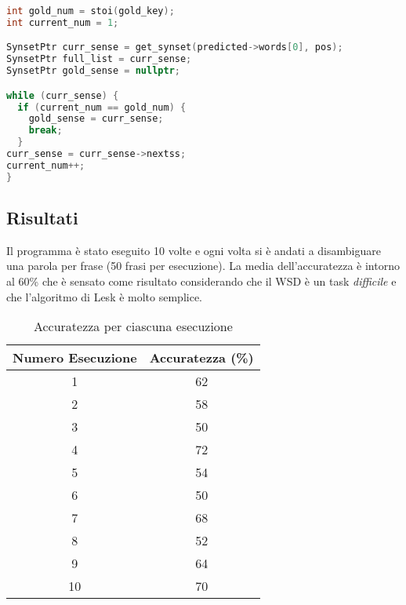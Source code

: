 \begin{lstlisting}[language=cpp, caption= Validazione della predizione dell'algoritmo di Lesk tramite confronto con gold sense.]
int gold_num = stoi(gold_key);
int current_num = 1;

SynsetPtr curr_sense = get_synset(predicted->words[0], pos);
SynsetPtr full_list = curr_sense;
SynsetPtr gold_sense = nullptr;

while (curr_sense) {
  if (current_num == gold_num) {
    gold_sense = curr_sense;
    break;
  }
curr_sense = curr_sense->nextss;
current_num++;
}
\end{lstlisting}

\subsection{Risultati}

Il programma è stato eseguito 10 volte e ogni volta si è andati a disambiguare una parola per frase (50 frasi per esecuzione). La media dell'accuratezza è intorno al 60\% che è sensato come risultato considerando che il WSD è un task \textit{difficile} e che l'algoritmo di Lesk è molto semplice.

\begin{table}[h!]
\centering
\begin{tabular}{|c|c|}
\hline
\textbf{Numero Esecuzione} & \textbf{Accuratezza (\%)} \\
\hline
1 & 62 \\
2 & 58 \\
3 & 50 \\
4 & 72 \\
5 & 54 \\
6 & 50 \\
7 & 68 \\
8 & 52 \\
9 & 64 \\
10 & 70 \\
\hline
\end{tabular}
\caption{Accuratezza per ciascuna esecuzione}
\end{table}

